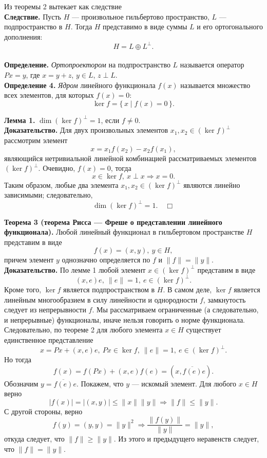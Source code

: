 \documentclass[12pt,a4paper, titlepage]{article}
\begin{document}
Из теоремы 2 вытекает как следствие\\
\textbf{Следствие.} Пусть $H$ --- произвольное гильбертово пространство, $L$ --- подпространство в $H$. Тогда $H$ представимо в виде суммы $L$ и его ортогонального дополнения:
$$
H = L \oplus L^\perp.
$$ \\

\textbf{Определение.} \textit{Ортопроектором} на подпространство $L$ называется оператор $Px = y$, где $x = y + z$, $y \in L$, $z \perp L$.\\

\textbf{Определение 4.} \textit{Ядром} линейного функционала $f(x)$ называется множество всех элементов, для которых $f(x) = 0$:
$$
\ker f = \{\,x \mid f(x) = 0\,\}.
$$

\textbf{Лемма 1.} $\dim (\ker f)^{\perp} = 1$, если $f \neq 0.$\\
\textbf{Доказательство.} Для двух произвольных элементов $x_1, x_2 \in (\ker f)^\perp$ рассмотрим элемент
$$
x = x_1 f(x_2) - x_2 f(x_1),
$$
являющийся нетривиальной линейной комбинацией рассматриваемых элементов $(\ker f)^\perp$.
Очевидно, $f(x) = 0$, тогда 
$$
x \in \ker f,\ x \perp x \Rightarrow x = 0.
$$
Таким образом, любые два элемента $x_1, x_2 \in (\ker f)^\perp$ являются линейно зависимыми; следовательно,
$$
\dim (\ker f)^{\perp} = 1. \quad \Box
$$

\textbf{Теорема 3 (теорема Рисса --- Фреше о представлении линейного функционала).} Любой линейный функционал в гильбертовом пространстве $H$ представим в виде
$$
f(x) = (x, y),\ y \in H,
$$
причем элемент $y$ однозначно определяется по $f$ и $\|f\| = \|y\|$.\\

\textbf{Доказательство.} По лемме 1 любой элемент $x \in (\ker f)^\perp$ представим в виде 
$$
(x, e)e,\ \|e\| = 1,\ e \in (\ker f)^\perp.
$$ 
Кроме того, $\ker f$ является подпространством в $H$. В самом деле, $\ker f$ является линейным многообразием в силу линейности и однородности $f$, замкнутость следует из непрерывности $f$. Мы рассматриваем ограниченные (а следовательно, и непрерывные) функционалы, иначе нельзя говорить о норме функционала.\\

Следовательно, по теореме 2 для любого элемента $x \in H$ существует единственное представление
$$
x = Px + (x, e) e,\ Px \in \ker f,\ \|e\| = 1,\ e \in (\ker f)^\perp.
$$
Но тогда
$$
f(x) = f(Px) + (x, e) f(e) = (x, \overline{f(e)} e).
$$
Обозначим $y = \overline{f(e)}e$. Покажем, что $y$ --- искомый элемент. Для любого $x \in H$ верно
$$
|f(x)| = |(x, y)| \leqslant \|x\| \|y\| \Rightarrow \|f\| \leqslant \|y\|.
$$
С другой стороны, верно 
$$
f(y) = (y, y) = \|y\|^2 \Rightarrow \frac{\|f(y)\|}{\|y\|} = \|y\|,
$$
откуда следует, что $\|f\| \geqslant \|y\|$. Из этого и предыдущего неравенств следует, что $\|f\| = \| y\|$.\\
\end{document}
